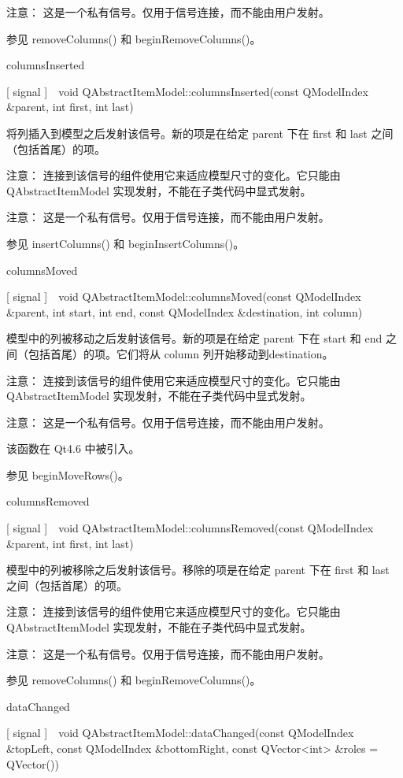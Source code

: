 注意： 这是一个私有信号。仅用于信号连接，而不能由用户发射。

参见 removeColumns() 和 beginRemoveColumns()。

columnsInserted

[ signal ] void QAbstractItemModel::columnsInserted(const QModelIndex \&parent, int first, int last)

将列插入到模型之后发射该信号。新的项是在给定 parent 下在 first 和 last 之间（包括首尾）的项。

注意： 连接到该信号的组件使用它来适应模型尺寸的变化。它只能由 QAbstractItemModel 实现发射，不能在子类代码中显式发射。

注意： 这是一个私有信号。仅用于信号连接，而不能由用户发射。

参见 insertColumns() 和 beginInsertColumns()。

columnsMoved

[ signal ] void QAbstractItemModel::columnsMoved(const QModelIndex \&parent, int start, int end, const QModelIndex \&destination, int column)

模型中的列被移动之后发射该信号。新的项是在给定 parent 下在 start 和 end 之间（包括首尾）的项。它们将从 column 列开始移动到destination。

注意： 连接到该信号的组件使用它来适应模型尺寸的变化。它只能由 QAbstractItemModel 实现发射，不能在子类代码中显式发射。

注意： 这是一个私有信号。仅用于信号连接，而不能由用户发射。

该函数在 Qt4.6 中被引入。

参见 beginMoveRows()。

columnsRemoved

[ signal ] void QAbstractItemModel::columnsRemoved(const QModelIndex \&parent, int first, int last)

模型中的列被移除之后发射该信号。移除的项是在给定 parent 下在 first 和 last 之间（包括首尾）的项。

注意： 连接到该信号的组件使用它来适应模型尺寸的变化。它只能由 QAbstractItemModel 实现发射，不能在子类代码中显式发射。

注意： 这是一个私有信号。仅用于信号连接，而不能由用户发射。

参见 removeColumns() 和 beginRemoveColumns()。

dataChanged

[ signal ] void QAbstractItemModel::dataChanged(const QModelIndex \&topLeft, const QModelIndex \&bottomRight, const QVector<int> \&roles = QVector())

